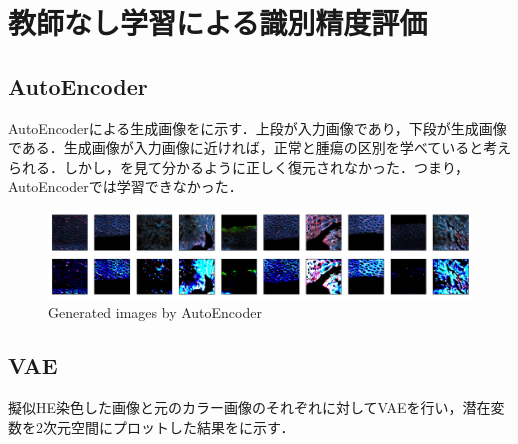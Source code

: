\section{教師なし学習による識別精度評価}

\subsection{AutoEncoder}
AutoEncoderによる生成画像をに示す．上段が入力画像であり，下段が生成画像である．生成画像が入力画像に近ければ，正常と腫瘍の区別を学べていると考えられる．しかし，を見て分かるように正しく復元されなかった．つまり，AutoEncoderでは学習できなかった．

\begin{figure}[H]
	\centering
	\includegraphics[width=\linewidth]{fig/chapter4/unet_ae}
	\caption{Generated images by AutoEncoder}
	\label{fig:unetae}
\end{figure}


\subsection{VAE}
擬似HE染色した画像と元のカラー画像のそれぞれに対してVAEを行い，潜在変数を2次元空間にプロットした結果をに示す．

